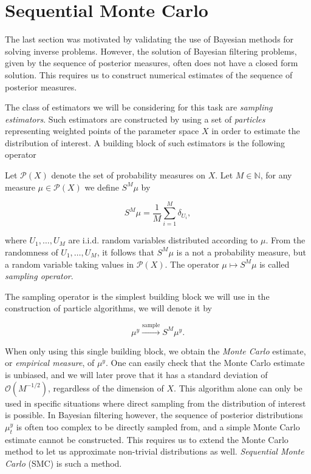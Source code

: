 \section{Sequential Monte Carlo}

The last section was motivated by validating the use of Bayesian methods for solving inverse problems. However, the solution of Bayesian filtering problems, given by the sequence of posterior measures, often does not have a closed form solution. This requires us to construct numerical estimates of the sequence of posterior measures.

The class of estimators we will be considering for this task are \textit{sampling estimators}. Such estimators are constructed by using a set of \textit{particles} representing weighted points of the parameter space $X$ in order to estimate the distribution of interest. A building block of such estimators is the following operator

\begin{definition}
  Let $\mathcal{P}(X)$ denote the set of probability measures on $X$. Let $M \in \mathbb{N}$, for any measure $\mu \in \mathcal{P}(X)$ we define $S^M\mu$ by

  \begin{equation*}
    S^M\mu = \frac1{M}\sum_{i=1}^M\delta_{U_i},
  \end{equation*}

  where $U_1, \ldots, U_M$ are i.i.d. random variables distributed according to $\mu$. From the randomness of $U_1, \ldots, U_M$, it follows that $S^M\mu$ is a not a probability measure, but a random variable taking values in $\mathcal{P}(X)$. The operator $\mu \mapsto S^M\mu$ is called \textit{sampling operator}.
\end{definition}

The sampling operator is the simplest building block we will use in the construction of particle algorithms, we will denote it by
 
\begin{equation*}
  \mu^y \xrightarrow{\text{sample}} S^M\mu^y.
\end{equation*}

When only using this single building block, we obtain the \textit{Monte Carlo} estimate, or \textit{empirical measure}, of $\mu^y$. One can easily check that the Monte Carlo estimate is unbiased, and we will later prove that it has a standard deviation of $\mathcal{O}(M^{-1/2})$, regardless of the dimension of $X$. This algorithm alone can only be used in specific situations where direct sampling from the distribution of interest is possible. In Bayesian filtering however, the sequence of posterior distributions $\mu^y_t$ is  often too complex to be directly sampled from, and a simple Monte Carlo estimate cannot be constructed. This requires us to extend the Monte Carlo method to let us approximate non-trivial distributions as well. \textit{Sequential Monte Carlo} (SMC) is such a method.

